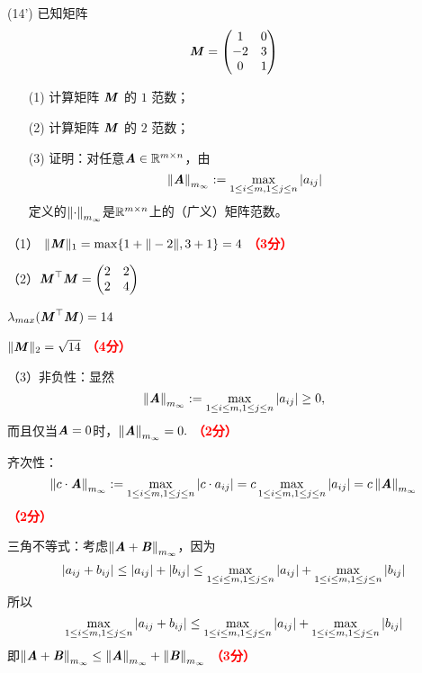 \documentclass[12pt,a4paper,openany,twoside]{ctexbook}
\begin{document}
\begin{exercise}(14')
	已知矩阵\[ \boldsymbol{\mathit{M}} = \begin{pmatrix}
		1&0\\
		-2&3\\
		0&1
	\end{pmatrix}
	\]
	\begin{itemize}
		\item [(1)] 计算矩阵 $\boldsymbol{\mathit{M}}$ 的 $1$ 范数；
		\item [(2)] 计算矩阵 $\boldsymbol{\mathit{M}}$ 的 $2$ 范数；
		\item [(3)] 证明：对任意$ \boldsymbol{\mathit{A}}\in\mathbb{R}^{m\times n} $，由
		\[ \left\lVert\boldsymbol{\mathit{A}}\right\rVert_{m_\infty} := \max_{1\leq i\leq m,1\leq j\leq n}\arrowvert a_{ij}\arrowvert \]
		定义的$ \left\lVert\cdot\right\rVert_{m_\infty} $是$ \mathbb{R}^{m\times n} $上的（广义）矩阵范数。
	\end{itemize}
\end{exercise}
\begin{Solution}
	（1）	
	$\|\boldsymbol{\mathit{M}}\|_1=\max\{1+\|-2\|,3+1\}=4$ \hfill \textcolor{red}{\textbf{（3分）}}
	
	（2）$\boldsymbol{\mathit{M}}^\top \boldsymbol{\mathit{M}}=\begin{pmatrix}2&2\\2&4\end{pmatrix}$
	
	$\lambda_{max}(\boldsymbol{\mathit{M}}^\top \boldsymbol{\mathit{M}})=14$
	
	$\|\boldsymbol{\mathit{M}}\|_2=\sqrt{14}$ \hfill \textcolor{red}{\textbf{（4分）}}
	
	（3）非负性：显然
	\[ \left\lVert\boldsymbol{\mathit{A}}\right\rVert_{m_\infty} := \max_{1\leq i\leq m,1\leq j\leq n}\arrowvert a_{ij}\arrowvert \geq 0, \]
	而且仅当$\boldsymbol{\mathit{A}}=0$时，$\left\lVert\boldsymbol{\mathit{A}}\right\rVert_{m_\infty}=0.$ \hfill \textcolor{red}{\textbf{（2分）}}
	
	齐次性：
	$$\left\lVert c \cdot \boldsymbol{\mathit{A}}\right\rVert_{m_\infty} := \max_{1\leq i\leq m,1\leq j\leq n}\arrowvert c \cdot a_{ij}\arrowvert 
	= c \max_{1\leq i\leq m,1\leq j\leq n}\arrowvert a_{ij}\arrowvert = c\left\lVert\boldsymbol{\mathit{A}}\right\rVert_{m_\infty}$$ \hfill \textcolor{red}{\textbf{（2分）}}
	
	三角不等式：考虑$\left\lVert\boldsymbol{\mathit{A}} + \boldsymbol{\mathit{B}}\right\rVert_{m_\infty}$，因为
	\[ \arrowvert a_{ij} + b_{ij} \arrowvert \leq \arrowvert a_{ij} \arrowvert + \arrowvert b_{ij} \arrowvert
	\leq \max_{1\leq i\leq m,1\leq j\leq n}\arrowvert a_{ij}\arrowvert + \max_{1\leq i\leq m,1\leq j\leq n}\arrowvert b_{ij}\arrowvert \]
	所以
	\[\max_{1\leq i\leq m,1\leq j\leq n} \arrowvert a_{ij} + b_{ij} \arrowvert
	\leq \max_{1\leq i\leq m,1\leq j\leq n}\arrowvert a_{ij}\arrowvert + \max_{1\leq i\leq m,1\leq j\leq n}\arrowvert b_{ij}\arrowvert \]
	即$\left\lVert\boldsymbol{\mathit{A}} + \boldsymbol{\mathit{B}}\right\rVert_{m_\infty} \leq \left\lVert\boldsymbol{\mathit{A}}\right\rVert_{m_\infty} + \left\lVert \boldsymbol{\mathit{B}}\right\rVert_{m_\infty}$ \hfill \textcolor{red}{\textbf{（3分）}}
\end{Solution}
\end{document}

